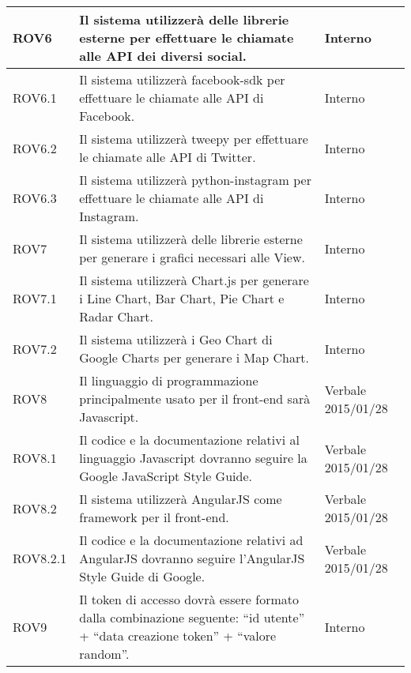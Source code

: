\begin{center}
\begin{longtable}{| p{2.5cm} | p{8cm} | p{2cm} |}
		ROV6  &  Il sistema utilizzerà delle librerie esterne per effettuare le chiamate alle API dei diversi social.  &  Interno \\
		\hline
		ROV6.1  &  Il sistema utilizzerà facebook-sdk per effettuare le chiamate alle API di Facebook.  &  Interno \\
		\hline
		ROV6.2  &  Il sistema utilizzerà tweepy per effettuare le chiamate alle API di Twitter.  &  Interno \\
		\hline
		ROV6.3  &  Il sistema utilizzerà python-instagram per effettuare le chiamate alle API di Instagram.  &  Interno \\
		\hline

		ROV7  &  Il sistema utilizzerà delle librerie esterne per generare i grafici necessari alle View.  &  Interno \\
		\hline
		ROV7.1  &  Il sistema utilizzerà Chart.js per generare i Line Chart, Bar Chart, Pie Chart e Radar Chart.  &  Interno \\
		\hline
		ROV7.2  &  Il sistema utilizzerà i Geo Chart di Google Charts per generare i Map Chart.  &  Interno \\
		\hline

		ROV8  &  Il linguaggio di programmazione principalmente usato per il front-end sarà Javascript.  &  Verbale 2015/01/28 \\
		\hline
		ROV8.1 & Il codice e la documentazione relativi al linguaggio Javascript dovranno seguire la Google JavaScript Style Guide. & Verbale 2015/01/28 \\
		\hline
		ROV8.2  &  Il sistema utilizzerà AngularJS come framework per il front-end.  &  Verbale 2015/01/28 \\
		\hline
		ROV8.2.1 & Il codice e la documentazione relativi ad AngularJS dovranno seguire l'AngularJS Style Guide di Google. & Verbale 2015/01/28 \\
		\hline
		ROV9  &  Il token di accesso dovrà essere formato dalla combinazione seguente: ``id utente'' + ``data creazione token'' + ``valore random''.  &  Interno \\
		\hline

	\end{longtable}
	\egroup
\end{center}
